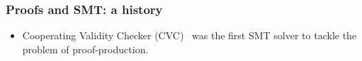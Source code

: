 \documentclass[svgnames,table,mathserif]{beamer}
\begin{document}
\begin{frame}
  \frametitle{Proofs and SMT: a history}

\begin{itemize}
\item Cooperating Validity Checker (CVC)~\cite{SBD02} was the first SMT solver to
tackle the problem of proof-production.
\end{itemize}



\end{frame}
\end{document}
